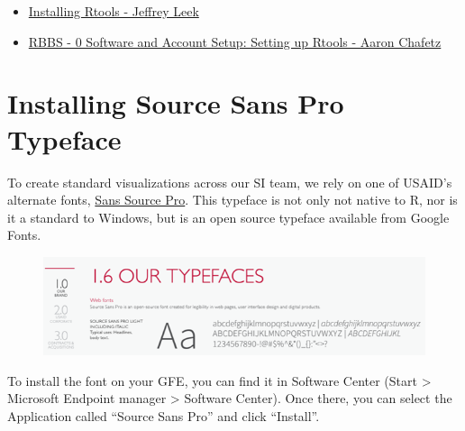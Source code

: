 \documentclass[
  letterpaper,
  DIV=11,
  numbers=noendperiod]{scrreprt}
\providecommand{\tightlist}{%
  \setlength{\itemsep}{0pt}\setlength{\parskip}{0pt}}\usepackage{longtable,booktabs,array}
\begin{document}
\begin{itemize}
\tightlist
\item
  \href{http://jtleek.com/modules/01_DataScientistToolbox/02_10_rtools/\#1}{Installing
  Rtools - Jeffrey Leek}
\item
  \href{https://usaid-oha-si.github.io/corps/rbbs/2022/01/28/rbbs-0-setup.html}{RBBS
  - 0 Software and Account Setup: Setting up Rtools - Aaron Chafetz}
\end{itemize}


\hypertarget{installing-source-sans-pro-typeface}{%
\chapter{Installing Source Sans Pro
Typeface}\label{installing-source-sans-pro-typeface}}

To create standard visualizations across our SI team, we rely on one of
USAID's alternate fonts,
\href{https://fonts.google.com/specimen/Source+Sans+Pro}{Sans Source
Pro}. This typeface is not only not native to R, nor is it a standard to
Windows, but is an open source typeface available from Google Fonts.

\begin{figure}

{\centering \includegraphics{./images/typeface_setup-usaid-style_font.png}

}

\end{figure}

To install the font on your GFE, you can find it in Software Center
(Start \textgreater{} Microsoft Endpoint manager \textgreater{} Software
Center). Once there, you can select the Application called ``Source Sans
Pro'' and click ``Install''.
\end{document}
